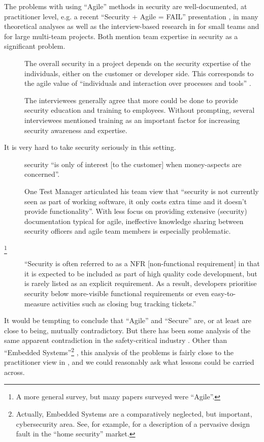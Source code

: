 \documentclass{llncs}
\begin{document}
The problems with using ``Agile'' methods in security are well-documented, at practitioner level, e.g. a recent ``Security + Agile = FAIL'' presentation \cite{Lane2018a}, in many theoretical analyses as well as the interview-based research in \cite{Bartsch2011a} for small teams and  \cite{vanderHeijdenetal2018a} for large multi-team projects. Both mention team expertise in security as a significant problem.
\begin{description}
\item[\cite{Bartsch2011a}]The
overall security in a project depends on the security expertise
of the individuals, either on the customer or developer side.
This corresponds to the agile value of ``individuals and
interaction over processes and tools'' \cite[Value 1]{Becketal2001}.
\item[\cite{vanderHeijdenetal2018a}]The interviewees
generally agree that more could be done to provide security education
and training to employees. Without prompting, several
interviewees mentioned training as an important factor for increasing
security awareness and expertise. 
\end{description}
It is very hard to take security seriously in this setting.
\begin{description}
\item[\cite{Bartsch2011a}]security ``is only of interest [to the customer] when money-aspects are
concerned''.
\item[\cite{vanderHeijdenetal2018a}]One Test Manager articulated his team view
that ``security is not currently seen as part of working software,
it only costs extra time and it doesn't provide functionality''.  With less focus on
providing extensive (security) documentation typical for agile, ineffective
knowledge sharing between security officers and agile team
members is especially problematic.
\item[\cite{TahaeiVaniea2019a}\footnote{A more general survey, but many papers surveyed were ``Agile''.}]``Security is often referred to as a NFR [non-functional requirement] in that it
is expected to be included as part of high quality code development,
but is rarely listed as an explicit requirement.
As a result, developers prioritise security below more-visible
functional requirements or even easy-to-measure activities
such as closing bug tracking tickets.''
\end{description}
\par\noindent
It would be tempting to conclude that ``Agile'' and ``Secure'' are, or at least are close to being, mutually contradictory. But there has been some analysis of the same apparent contradiction in the safety-critical industry \cite{Chapman2016a}.  Other than ``Embedded Systems''\footnote{Actually, Embedded Systems are a comparatively neglected, but important, cybersecurity area. See, for example, \cite{OConnoretal2019a} for a description of a pervasive design fault in the ``home security'' market.} \cite[\S 3.6]{Chapman2016a}, this analysis of the problems is fairly close to the practitioner view in \cite{Lane2018a}, and we could reasonably ask what lessons could be carried across. 
\end{document}
